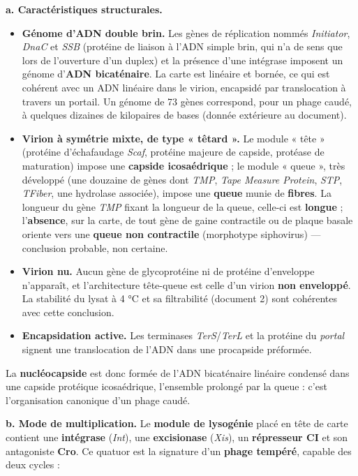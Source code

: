 \documentclass[11pt,a4paper]{article}
\providecommand{\tightlist}{\setlength{\itemsep}{0pt}\setlength{\parskip}{0pt}}
\begin{document}
\textbf{a. Caractéristiques structurales.}

\begin{itemize}
\tightlist
\item
  \textbf{Génome d'ADN double brin.} Les gènes de réplication nommés \emph{Initiator}, \emph{DnaC} et \emph{SSB} (protéine de liaison à l'ADN simple brin, qui n'a de sens que lors de l'ouverture d'un duplex) et la présence d'une intégrase imposent un génome d'\textbf{ADN bicaténaire}. La carte est linéaire et bornée, ce qui est cohérent avec un ADN linéaire dans le virion, encapsidé par translocation à travers un portail. Un génome de 73 gènes correspond, pour un phage caudé, à quelques dizaines de kilopaires de bases (donnée extérieure au document).
\item
  \textbf{Virion à symétrie mixte, de type « têtard ».} Le module « tête » (protéine d'échafaudage \emph{Scaf}, protéine majeure de capside, protéase de maturation) impose une \textbf{capside icosaédrique} ; le module « queue », très développé (une douzaine de gènes dont \emph{TMP}, \emph{Tape Measure Protein}, \emph{STP}, \emph{TFiber}, une hydrolase associée), impose une \textbf{queue} munie de \textbf{fibres}. La longueur du gène \emph{TMP} fixant la longueur de la queue, celle-ci est \textbf{longue} ; l'\textbf{absence}, sur la carte, de tout gène de gaine contractile ou de plaque basale oriente vers une \textbf{queue non contractile} (morphotype siphovirus) --- conclusion probable, non certaine.
\item
  \textbf{Virion nu.} Aucun gène de glycoprotéine ni de protéine d'enveloppe n'apparaît, et l'architecture tête-queue est celle d'un virion \textbf{non enveloppé}. La stabilité du lysat à 4 °C et sa filtrabilité (document 2) sont cohérentes avec cette conclusion.
\item
  \textbf{Encapsidation active.} Les terminases \emph{TerS}/\emph{TerL} et la protéine du \emph{portal} signent une translocation de l'ADN dans une procapside préformée.
\end{itemize}

La \textbf{nucléocapside} est donc formée de l'ADN bicaténaire linéaire condensé dans une capside protéique icosaédrique, l'ensemble prolongé par la queue : c'est l'organisation canonique d'un phage caudé.

\textbf{b. Mode de multiplication.} Le \textbf{module de lysogénie} placé en tête de carte contient une \textbf{intégrase} (\emph{Int}), une \textbf{excisionase} (\emph{Xis}), un \textbf{répresseur CI} et son antagoniste \textbf{Cro}. Ce quatuor est la signature d'un \textbf{phage tempéré}, capable des deux cycles :
\end{document}
